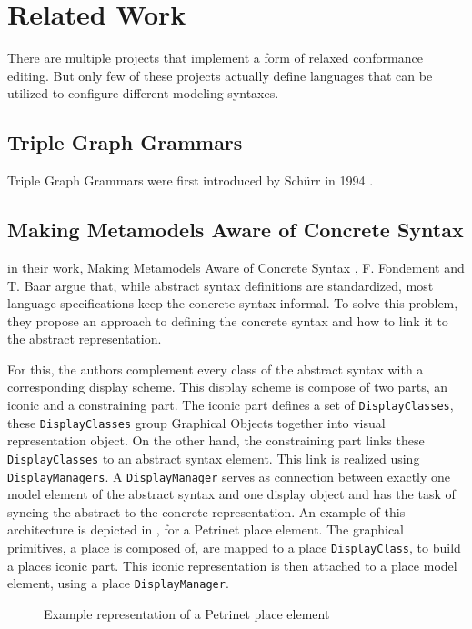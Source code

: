 \chapter{Related Work}
\label{ch:related_work}

There are multiple projects that implement a form of relaxed conformance editing. But only few of these projects actually define languages that can be utilized to configure different modeling syntaxes. 




\section{Triple Graph Grammars}
Triple Graph Grammars were first introduced by Schürr in 1994 \cite{schurr_specification_1994}.


\section{Making Metamodels Aware of Concrete Syntax}
\label{sec:fondement}
in their work, Making Metamodels Aware of Concrete Syntax \cite{fondement_making_2005}, F. Fondement and T. Baar argue that, while abstract syntax definitions are standardized, most language specifications keep the concrete syntax informal. To solve this problem, they propose an approach to defining the concrete syntax and how to link it to the abstract representation.

For this, the authors complement every class of the abstract syntax with a corresponding display scheme. This display scheme is compose of two parts, an iconic and a constraining part. The iconic part defines a set of \texttt{DisplayClasses}, these \texttt{DisplayClasses} group Graphical Objects together into visual representation object. On the other hand, the constraining part links these \texttt{DisplayClasses} to an abstract syntax element. This link is realized using \texttt{DisplayManagers}. A \texttt{DisplayManager} serves as connection between exactly one model element of the abstract syntax and one display object and has the task of syncing the abstract to the concrete representation. An example of this architecture is depicted in , for a Petrinet place element. The graphical primitives, a place is composed of, are mapped to a place \texttt{DisplayClass}, to build a places iconic part. This iconic representation is then attached to a place model element, using a place \texttt{DisplayManager}.


\begin{figure}[H]
  \centering
  
  \caption{Example representation of a Petrinet place element}
  \label{fig:fondement_dm}
\end{figure}

